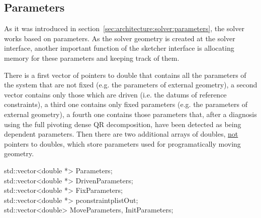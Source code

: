 \documentclass[12pt,twoside,a4paper]{book}
\begin{document}
    \subsection{Parameters}

    As it was introduced in section~\ref{sec:architecture:solver:parameters}, the solver works based on parameters. As the solver geometry is created at the solver interface, another important function of the sketcher interface is allocating memory for these parameters and keeping track of them.

    There is a first vector of pointers to double that contains all the parameters of the system that are not fixed (e.g. the parameters of external geometry), a second vector contains only those which are driven (i.e. the datums of reference constraints), a third one contains only fixed parameters (e.g. the parameters of external geometry), a fourth one contains those parameters that, after a diagnosis using the full pivoting dense QR decomposition, have been detected as being dependent parameters. Then there are two additional arrays of doubles, \underline{not} pointers to doubles, which store parameters used for programatically moving geometry.

    \begin{codequote}
    std::vector\textless{}double *\textgreater{} Parameters;\\
    std::vector\textless{}double *\textgreater{} DrivenParameters;\\
    std::vector\textless{}double *\textgreater{} FixParameters;\\
    std::vector\textless{}double *\textgreater{} pconstraintplistOut;\\
    std::vector\textless{}double\textgreater{} MoveParameters, InitParameters;
    \end{codequote}
\end{document}
